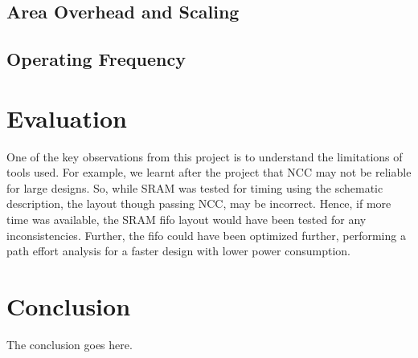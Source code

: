 \documentclass[12pt,journal,compsoc]{IEEEtran}
\begin{document}
\subsection{Area Overhead and Scaling}
\subsection{Operating Frequency}
\section {Evaluation}
One of the key observations from this project is to understand the limitations of tools used. For example, we learnt after the project that NCC may not be reliable for large designs. So, while SRAM was tested for timing using the schematic description, the layout though passing NCC, may be incorrect. Hence, if more time was available, the SRAM fifo layout would have been tested for any inconsistencies. Further, the fifo could have been optimized further, performing a path effort analysis for a faster design with lower power consumption. 
\section{Conclusion}
The conclusion goes here.













\end{document}
